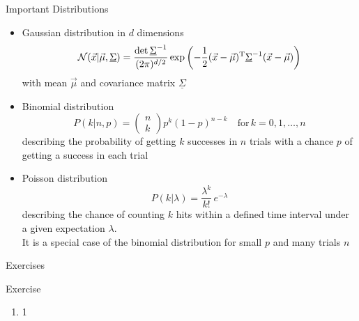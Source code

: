   \begin{frame}{Important Distributions}
    \begin{itemize}
      \item Gaussian distribution in $d$ dimensions
        \begin{equation*}
          \mathcal{N}(\vec{x}|\vec{\mu},\underline{\Sigma})
          = \frac{\det{\underline{\Sigma}^{-1}}}{(2\pi)^{d/2}}
            \exp\left(
              -\frac{1}{2} (\vec{x}-\vec{\mu})^{\text{T}}
              \underline{\Sigma}^{-1} (\vec{x}-\vec{\mu})
            \right)
        \end{equation*}
        with mean $\vec{\mu}$ and covariance matrix $\underline{\Sigma}$
      \item Binomial distribution
        \begin{equation*}
          P(k|n,p) = \begin{pmatrix} n \\ k \end{pmatrix} p^k (1-p)^{n-k}
          \quad\text{for}\, k = 0, 1, \dots, n
        \end{equation*}
        describing the probability of getting $k$ successes in $n$ trials with a chance $p$ of getting a success in each trial
      \item Poisson distribution
      \begin{equation*}
        P(k|\lambda) = \frac{\lambda^k}{k!}\,e^{-\lambda}
      \end{equation*}
      describing the chance of counting $k$ hits within a defined time interval under a given expectation $\lambda$.\\
      It is a special case of the binomial distribution for small $p$ and many trials $n$
    \end{itemize}
  \end{frame}

  \begin{frame}{Exercises}
    \begin{exampleblock}{Exercise}
      \begin{enumerate}
        \item 1
      \end{enumerate}
    \end{exampleblock}
  \end{frame}

